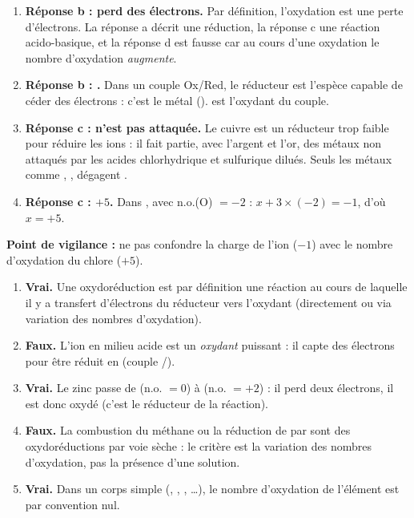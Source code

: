 \documentclass[11pt]{article}
\newcommand{\cle}[1]{{\popxbold\color{popdark}#1}}
\begin{document}
\begin{corrige}
\begin{enumerate}
\item \textbf{Réponse b : perd des électrons.} Par définition, l'\cle{oxydation} est une perte d'électrons. La réponse a décrit une réduction, la réponse c une réaction acido-basique, et la réponse d est fausse car au cours d'une oxydation le nombre d'oxydation \emph{augmente}.
\item \textbf{Réponse b : .} Dans un couple Ox/Red, le \cle{réducteur} est l'espèce capable de céder des électrons : c'est le métal  ().  est l'oxydant du couple.
\item \textbf{Réponse c : n'est pas attaquée.} Le cuivre est un réducteur trop faible pour réduire les ions  : il fait partie, avec l'argent et l'or, des métaux non attaqués par les acides chlorhydrique et sulfurique dilués. Seuls les métaux comme , ,  dégagent .
\item \textbf{Réponse c : $+5$.} Dans , avec n.o.(O) $= -2$ : $x + 3\times(-2) = -1$, d'où $x = +5$.
\end{enumerate}
\textbf{Point de vigilance :} ne pas confondre la charge de l'ion ($-1$) avec le nombre d'oxydation du chlore ($+5$).
\end{corrige}

\begin{corrige}
\begin{enumerate}
\item \textbf{Vrai.} Une oxydoréduction est par définition une réaction au cours de laquelle il y a transfert d'électrons du réducteur vers l'oxydant (directement ou via variation des nombres d'oxydation).
\item \textbf{Faux.} L'ion  en milieu acide est un \emph{oxydant} puissant : il capte des électrons pour être réduit en  (couple /).
\item \textbf{Vrai.} Le zinc passe de  (n.o. $= 0$) à  (n.o. $= +2$) : il perd deux électrons, il est donc oxydé (c'est le réducteur de la réaction).
\item \textbf{Faux.} La combustion du méthane  ou la réduction de  par  sont des oxydoréductions par voie sèche : le critère est la variation des nombres d'oxydation, pas la présence d'une solution.
\item \textbf{Vrai.} Dans un corps simple (, , , \ldots), le nombre d'oxydation de l'élément est par convention nul.
\end{enumerate}
\end{corrige}
\end{document}
